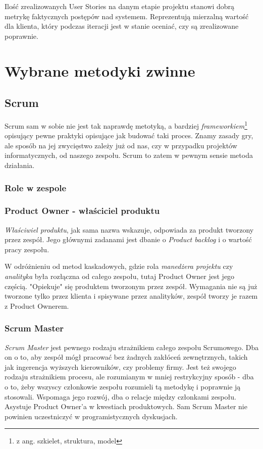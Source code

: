 \documentclass{article}
\begin{document}
Ilość zrealizowanych User Stories na danym etapie projektu stanowi dobrą metrykę faktycznych postępów nad systemem. Reprezentują mierzalną wartość dla klienta, który podczas iteracji jest w stanie oceniać, czy są zrealizowane poprawnie.

\section{Wybrane metodyki zwinne}

\subsection{Scrum}

Scrum sam w sobie nie jest tak naprawdę metotyką, a bardziej \textit{frameworkiem}\footnote{z ang. szkielet, struktura, model} opisujący pewne praktyki opisujące jak budować taki proces\cite{scrum}. Znamy zasady gry, ale sposób na jej zwycięstwo zależy już od nas, czy w przypadku projektów informatycznych, od naszego zespołu. Scrum to zatem w pewnym sensie metoda działania.

\subsubsection{Role w zespole}

\subsubsection*{Product Owner - właściciel produktu}
\textit{Właściwiel produktu}, jak sama nazwa wskazuje, odpowiada za produkt tworzony przez zespół. Jego głównymi zadanami jest dbanie o \textit{Product backlog} i o wartość pracy zespołu.

W odróżnieniu od metod kaskadowych, gdzie rola \textit{manedżera projektu} czy \textit{analityka} była rozłączna od całego zespołu, tutaj Product Owner jest jego częścią. "Opiekuje" się produktem tworzonym przez zespół. Wymagania nie są już tworzone tylko przez klienta i spisywane przez analityków, zespół tworzy je razem z Product Ownerem.\cite{scrum}
\subsubsection*{Scrum Master}

\textit{Scrum Master} jest pewnego rodzaju strażnikiem całego zespołu Scrumowego. Dba on o to, aby zespół mógł pracować bez żadnych zakłóceń zewnętrznych, takich jak ingerencja wyższych kierowników, czy problemy firmy. Jest też swojego rodzaju strażnikiem procesu, ale rozumianym w mniej restrykcyjny sposób - dba o to, żeby wszyscy członkowie zespołu rozumieli tą metodykę i poprawnie ją stosowali. Wspomaga jego rozwój, dba o relacje między członkami zespołu. Asystuje Product Owner'a w kwestiach produktowych. Sam Scrum Master nie powinien uczestniczyć w programistycznych dyskusjach.\cite{scrum}
\end{document}
